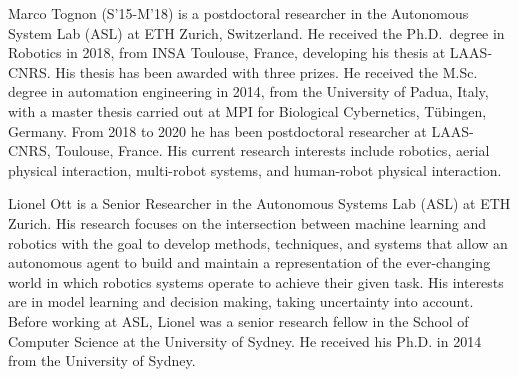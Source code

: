 \documentclass[journal]{IEEEtran}  %
\begin{document}
\begin{IEEEbiography}{Marco Tognon}
(S'15-M'18) is a postdoctoral researcher in the Autonomous System Lab (ASL) at ETH Zurich, Switzerland.
He received the Ph.D.~degree in Robotics in 2018, from INSA Toulouse, France, developing his thesis at LAAS-CNRS.
His thesis has been awarded with three prizes. 
He received the M.Sc. degree in automation engineering in 2014, from the University of Padua, Italy, with a master thesis carried out at MPI for Biological Cybernetics, T\"ubingen, Germany.
From 2018 to 2020 he has been postdoctoral researcher at LAAS-CNRS, Toulouse, France. 
His current research interests include robotics, aerial physical interaction, multi-robot systems, and human-robot physical interaction.
\end{IEEEbiography}
\vspace{-1cm}
\begin{IEEEbiography}{Lionel Ott} is a Senior Researcher in the Autonomous Systems Lab (ASL) at ETH Zurich. His research focuses on the intersection between machine learning and robotics with the goal to develop methods, techniques, and systems that allow an autonomous agent to build and maintain a representation of the ever-changing world in which robotics systems operate to achieve their given task. His interests are in model learning and decision making, taking uncertainty into account. Before working at ASL, Lionel was a senior research fellow in the School of Computer Science at the University of Sydney. He received his Ph.D. in 2014 from the University of Sydney.
\end{IEEEbiography}
\end{document}
